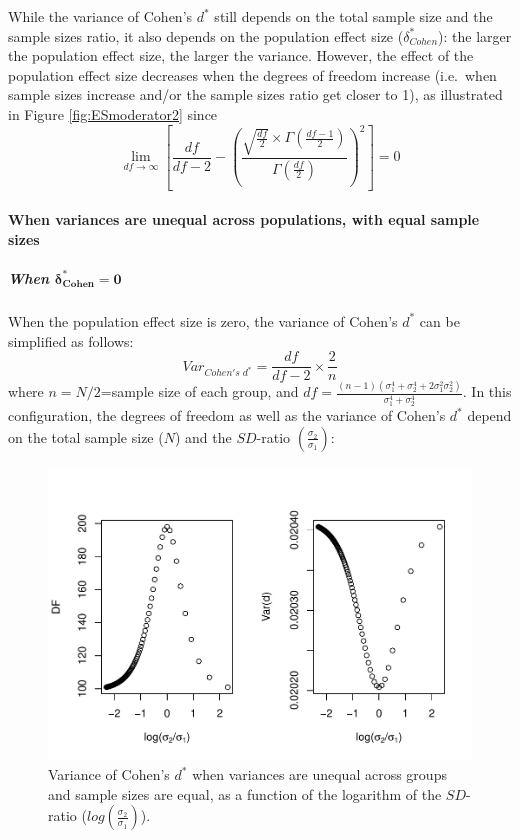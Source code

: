 \documentclass[
  english,
  man,mask]{apa6}
\let\oldparagraph\paragraph
\renewcommand{\paragraph}[1]{\oldparagraph{#1}\mbox{}}
\let\oldsubparagraph\subparagraph
\renewcommand{\subparagraph}[1]{\oldsubparagraph{#1}\mbox{}}
\begin{document}
While the variance of Cohen's \(d^*\) still depends on the total sample size and the sample sizes ratio, it also depends on the population effect size (\(\delta^*_{Cohen}\)): the larger the population effect size, the larger the variance. However, the effect of the population effect size decreases when the degrees of freedom increase (i.e.~when sample sizes increase and/or the sample sizes ratio get closer to 1), as illustrated in Figure \ref{fig:ESmoderator2} since
\[\lim_{df\rightarrow \infty}\left[\frac{df}{df-2} - \left( \frac{\sqrt{\frac{df}{2}} \times \Gamma \left(\frac{df-1}{2} \right)}{\Gamma \left( \frac{df}{2}\right)}\right)^2 \right]=0\]

\hypertarget{when-variances-are-unequal-across-populations-with-equal-sample-sizes-3}{%
\paragraph{When variances are unequal across populations, with equal sample sizes}\label{when-variances-are-unequal-across-populations-with-equal-sample-sizes-3}}

\hypertarget{when-bmdelta_cohen-0-1}{%
\subparagraph{\texorpdfstring{When \(\bm{\delta^*_{Cohen} = 0}\)}{When \textbackslash bm\{\textbackslash delta\^{}*\_\{Cohen\} = 0\}}}\label{when-bmdelta_cohen-0-1}}

When the population effect size is zero, the variance of Cohen's \(d^*\) can be simplified as follows:
\[Var_{Cohen's \; d^*} = \frac{df}{df-2} \times \frac{2}{n}\]
where \(n=N/2\)=sample size of each group, and \(df=\frac{(n-1)(\sigma^4_1+\sigma^4_2+2\sigma^2_1\sigma^2_2)}{\sigma^4_1+\sigma^4_2}\). In this configuration, the degrees of freedom as well as the variance of Cohen's \(d^*\) depend on the total sample size (\(N\)) and the \(SD\)-ratio \(\left( \frac{\sigma_2}{\sigma_1}\right)\):

\begin{figure}
\centering
\includegraphics{Theoretical-Bias-of-all-estimators-as-a-function-of-population-parameters_files/figure-latex/varcohendprimehetbalSDratio2-1.pdf}
\caption{\label{fig:varcohendprimehetbalSDratio2}Variance of Cohen's \(d^*\) when variances are unequal across groups and sample sizes are equal, as a function of the logarithm of the \(SD\)-ratio (\(log \left( \frac{\sigma_2}{\sigma_1} \right)\)).}
\end{figure}
\end{document}
